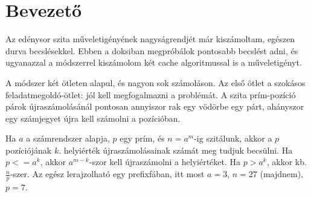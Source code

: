 \documentclass{article}
\begin{document}
\tableofcontents

\section{Bevezető}

Az edénysor szita műveletigényének nagyságrendjét már kiszámoltam, egészen durva becslésekkel.
Ebben a doksiban megpróbálok pontosabb becslést adni, és ugyanazzal a módszerrel kiszámolom két cache algoritmussal is a műveletigényt.

A módszer két ötleten alapul, és nagyon sok számoláson.
Az első ötlet a szokásos feladatmegoldó-ötlet: jól kell megfogalmazni a problémát.
A szita prím-pozíció párok újraszámolásánál pontosan annyiszor rak egy vödörbe egy párt, ahányszor egy számjegyet újra kell számolni a pozícióban.

Ha $a$ a számrendszer alapja, $p$ egy prím, és $n=a^m$-ig szitálunk, akkor a $p$ pozíciójának $k$. helyiérték újraszámolásainak számát meg tudjuk becsülni.
Ha $p <= a^k$, akkor $a^{m-k}$-szor kell újraszámolni a helyiértéket.
Ha $p > a^k$, akkor kb. $\frac{n}{p}$-szer. Az egész lerajzolható egy prefixfában, itt most $a=3$, $n=27$ (majdnem), $p=7$.
\end{document}
